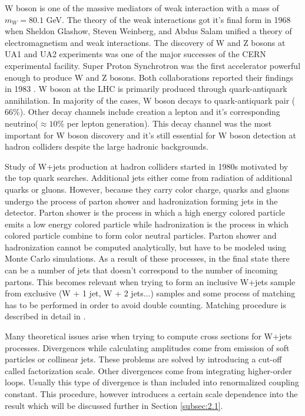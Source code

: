 W boson is one of the massive mediators of weak interaction with a mass of $m_W=80.1$ GeV.
The theory of the weak interactions got it's final form in 1968 when Sheldon Glashow, Steven Weinberg, and Abdus Salam unified a theory of electromagnetism and weak interactions. The discovery of W and Z bosons at UA1 and UA2 experiments was one of the major successes of the CERN experimental facility. Super Proton Synchrotron was the first accelerator powerful enough to produce W and Z bosons. Both collaborations reported their findings in 1983 \cite{Arnison:1983rp,Banner:1983jy}.
W boson at the LHC is primarily produced through quark-antiquark annihilation. In majority of the cases, W boson decays to quark-antiquark pair ($66\%$). Other decay channels include creation a lepton and it's corresponding neutrino($\approx 10\%$ per lepton generation). This decay channel was the most important for W boson discovery and it's still essential for W boson detection at hadron colliders despite the large hadronic backgrounds. 
\par Study of W+jets production at hadron colliders started in 1980s motivated by the top quark searches. Additional jets either come from radiation of additional quarks or gluons. However, because they carry color charge, quarks and gluons undergo the process of parton shower and hadronization forming jets in the detector. Parton shower is the process in which a high energy colored particle emits a low energy colored particle while hadronization is the process in which colored particle combine to form color neutral particles. Parton shower and hadronization cannot be computed analytically, but have to be modeled using Monte Carlo simulations. As a result of these processes, in the final state there can be a number of jets that doesn't  correspond to the number of incoming partons. This becomes relevant when trying to form an inclusive W+jets sample from exclusive (W + 1 jet, W + 2 jets...) samples and some process of matching has to be performed in order to avoid double counting. Matching procedure is described in detail in \cite{Campbell:2008cr}.  
\par Many theoretical issues arise when trying to compute cross sections for W+jets processes. Divergences while calculating amplitudes come from emission of soft particles or collinear jets. These problems are solved by introducing a cut-off called factorization scale. Other divergences come from integrating higher-order loops. Usually this type of divergence is than included into renormalized coupling constant. This procedure, however introduces a certain scale dependence into the result which will be discussed further in Section \ref{subsec:2.1}. 


